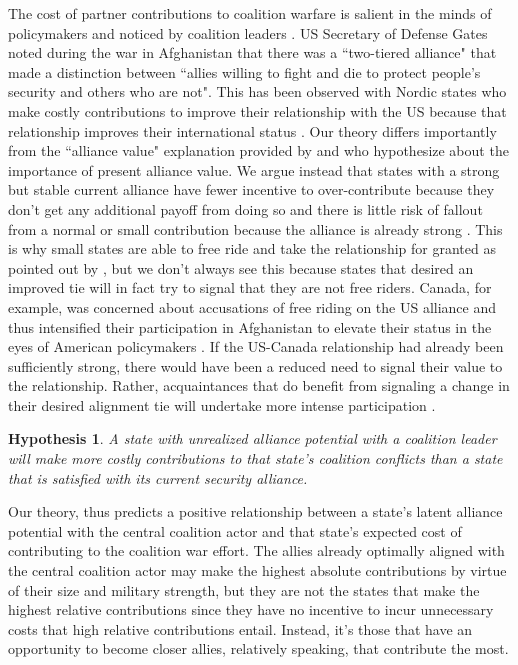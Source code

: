 \documentclass[12pt,letterpaper]{article}
\newtheorem{hyp}{Hypothesis}
\begin{document}
		The cost of partner contributions to coalition warfare is salient in the minds of policymakers and noticed by coalition leaders \citep[328]{ringsmose_natoburdensharingredux_2010}. US Secretary of Defense Gates noted during the war in Afghanistan that there was a ``two-tiered alliance" that made a distinction between ``allies willing to fight and die to protect people's security and others who are not". This has been observed with Nordic states who make costly contributions to improve their relationship with the US because that relationship improves their international status \citep{pedersen_bandwagonstatuschanging_2018}. Our theory differs importantly from the ``alliance value" explanation provided by \citet{davidson_americaallieswar_2011} and \citet{massie_democraticalliesfollowership_2016} who hypothesize about the importance of present alliance value. We argue instead that states with a strong but stable current alliance have fewer incentive to over-contribute because they don't get any additional payoff from doing so and there is little risk of fallout from a normal or small contribution because the alliance is already strong \citep{davidson_headingexitsdemocratic_2014}. This is why small states are able to free ride and take the relationship for granted as pointed out by \citet{keohane_biginfluencesmall_1971}, but we don't always see this because states that desired an improved tie will in fact try to signal that they are not free riders. Canada, for example, was concerned about accusations of free riding on the US alliance and thus intensified their participation in Afghanistan to elevate their status in the eyes of American policymakers \citep{massie_alliancevaluestatus_2018}. If the US-Canada relationship had already been sufficiently strong, there would have been a reduced need to signal their value to the relationship. Rather, acquaintances that do benefit from signaling a change in their desired alignment tie will undertake more intense participation \citep{gibler_priorcommitmentscompatible_2004, gartzke_contractsfriendsalliances_2012}.

		\begin{hyp}
			A state with unrealized alliance potential with a coalition leader will make more costly contributions to that state's coalition conflicts than a state that is satisfied with its current security alliance.
		\end{hyp}

		Our theory, thus predicts a positive relationship between a state's latent alliance potential with the central coalition actor and that state's expected cost of contributing to the coalition war effort. The allies already optimally aligned with the central coalition actor may make the highest absolute contributions by virtue of their size and military strength, but they are not the states that make the highest relative contributions since they have no incentive to incur unnecessary costs that high relative contributions entail. Instead, it's those that have an opportunity to become closer allies, relatively speaking, that contribute the most.
\end{document}
